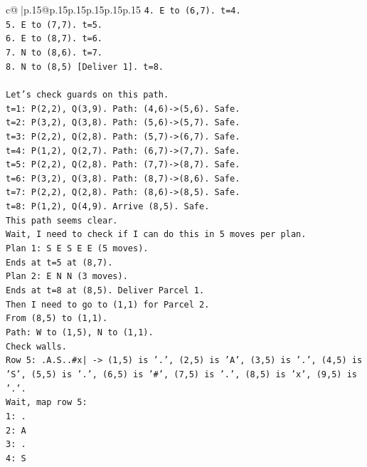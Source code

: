 \documentclass{article}
\begin{document}
{\begin{supertabular}{c@{$\;$}|p{.15\linewidth}@{}p{.15\linewidth}p{.15\linewidth}p{.15\linewidth}p{.15\linewidth}p{.15\linewidth}}
{{{\texttt{4. E to (6,7). t=4.} \\
\texttt{5. E to (7,7). t=5.} \\
\texttt{6. E to (8,7). t=6.} \\
\texttt{7. N to (8,6). t=7.} \\
\texttt{8. N to (8,5) {[}Deliver 1{]}. t=8.} \\
\\ 
\texttt{Let's check guards on this path.} \\
\texttt{t=1: P(2,2), Q(3,9). Path: (4,6){-}>(5,6). Safe.} \\
\texttt{t=2: P(3,2), Q(3,8). Path: (5,6){-}>(5,7). Safe.} \\
\texttt{t=3: P(2,2), Q(2,8). Path: (5,7){-}>(6,7). Safe.} \\
\texttt{t=4: P(1,2), Q(2,7). Path: (6,7){-}>(7,7). Safe.} \\
\texttt{t=5: P(2,2), Q(2,8). Path: (7,7){-}>(8,7). Safe.} \\
\texttt{t=6: P(3,2), Q(3,8). Path: (8,7){-}>(8,6). Safe.} \\
\texttt{t=7: P(2,2), Q(2,8). Path: (8,6){-}>(8,5). Safe.} \\
\texttt{t=8: P(1,2), Q(4,9). Arrive (8,5). Safe.} \\
\texttt{This path seems clear.} \\
\texttt{Wait, I need to check if I can do this in 5 moves per plan.} \\
\texttt{Plan 1: S E S E E (5 moves).} \\
\texttt{Ends at t=5 at (8,7).} \\
\texttt{Plan 2: E N N (3 moves).} \\
\texttt{Ends at t=8 at (8,5). Deliver Parcel 1.} \\
\texttt{Then I need to go to (1,1) for Parcel 2.} \\
\texttt{From (8,5) to (1,1).} \\
\texttt{Path: W to (1,5), N to (1,1).} \\
\texttt{Check walls.} \\
\texttt{Row 5: .A.S..\#x| {-}> (1,5) is '.', (2,5) is 'A', (3,5) is '.', (4,5) is 'S', (5,5) is '.', (6,5) is '\#', (7,5) is '.', (8,5) is 'x', (9,5) is '.'.} \\
\texttt{Wait, map row 5:} \\
\texttt{1: .} \\
\texttt{2: A} \\
\texttt{3: .} \\
\texttt{4: S} \\
}}}
\end{supertabular}}
\end{document}
